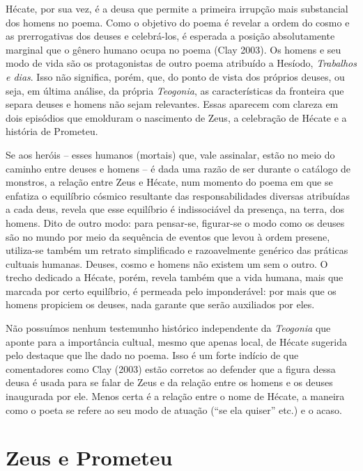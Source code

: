 Hécate, por sua vez, é a deusa que permite a primeira irrupção mais
substancial dos homens no poema. Como o objetivo do poema é revelar a
ordem do cosmo e as prerrogativas dos deuses e celebrá-los, é esperada a
posição absolutamente marginal que o gênero humano ocupa no poema (Clay
2003). Os homens e seu modo de vida são os protagonistas de outro poema
atribuído a Hesíodo, \emph{Trabalhos e dias}. Isso não significa, porém,
que, do ponto de vista dos próprios deuses, ou seja, em última análise,
da própria \emph{Teogonia}, as características da fronteira que separa
deuses e homens não sejam relevantes. Essas aparecem com clareza em dois
episódios que emolduram o nascimento de Zeus, a celebração de Hécate e a
história de Prometeu.

Se aos heróis -- esses humanos (mortais) que, vale assinalar, estão no
meio do caminho entre deuses e homens -- é dada uma razão de ser durante
o catálogo de monstros, a relação entre Zeus e Hécate, num momento do
poema em que se enfatiza o equilíbrio cósmico resultante das
responsabilidades diversas atribuídas a cada deus, revela que esse
equilíbrio é indissociável da presença, na terra, dos homens. Dito de
outro modo: para pensar-se, figurar-se o modo como os deuses são no
mundo por meio da sequência de eventos que levou à ordem presene,
utiliza-se também um retrato simplificado e razoavelmente genérico das
práticas cultuais humanas. Deuses, cosmo e homens não existem um sem o
outro. O trecho dedicado a Hécate, porém, revela também que a vida
humana, mais que marcada por certo equilíbrio, é permeada pelo
imponderável: por mais que os homens propiciem os deuses, nada garante
que serão auxiliados por eles.

Não possuímos nenhum testemunho histórico independente da
\emph{Teogonia} que aponte para a importância cultual, mesmo que apenas
local, de Hécate sugerida pelo destaque que lhe dado no poema. Isso é um
forte indício de que comentadores como Clay (2003) estão corretos ao
defender que a figura dessa deusa é usada para se falar de Zeus e da
relação entre os homens e os deuses inaugurada por ele. Menos certa é a
relação entre o nome de Hécate, a maneira como o poeta se refere ao seu
modo de atuação (``se ela quiser'' etc.) e o acaso.

\section{Zeus e Prometeu}

